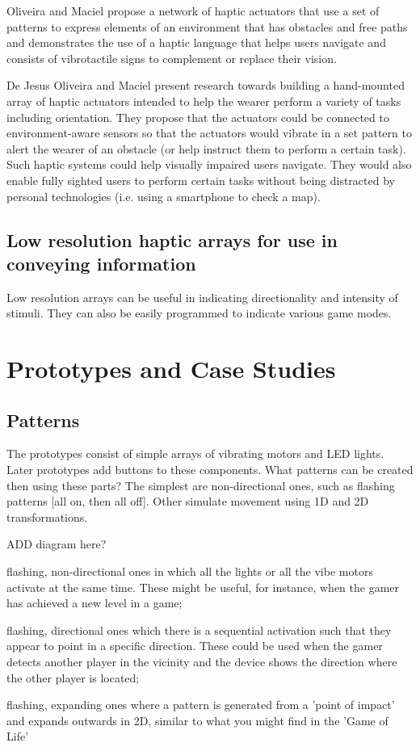 \documentclass{chi-ext}
\begin{document}
Oliveira and Maciel propose a network of haptic actuators that use a set of patterns to express elements of an environment that has obstacles and free paths and demonstrates the use of a haptic language that helps users navigate and consists of vibrotactile signs to complement or replace their vision. \cite{Jesus-Oliveira:2013aa}

De Jesus Oliveira and Maciel \cite{Jesus-Oliveira:2013aa} present research towards building a hand-mounted array of haptic actuators intended to help the wearer perform a variety of tasks including orientation. They propose that the actuators could be connected to environment-aware sensors so that the actuators would vibrate in a set pattern to alert the wearer of an obstacle (or help instruct them to perform a certain task). Such haptic systems could help visually impaired users navigate. They would also enable fully sighted users to perform certain tasks without being distracted by personal technologies (i.e. using a smartphone to check a map).

\subsection{Low resolution haptic arrays for use in conveying information}
Low resolution arrays can be useful in indicating directionality and intensity of stimuli. They can also be easily programmed to indicate various game modes. 

\section{Prototypes and Case Studies}
\subsection{Patterns}
The prototypes consist of simple arrays of vibrating motors and LED lights. Later prototypes add buttons to these components. What patterns can be created then using these parts? The simplest are non-directional ones, such as flashing patterns [all on, then all off]. Other simulate movement using 1D and 2D transformations.

ADD diagram here?

\begin{inparaenum}
\item flashing, non-directional ones in which all the lights or all the vibe motors activate at the same time. These might be useful, for instance, when the gamer has achieved a new level in a game;
\item flashing, directional ones which there is a sequential activation such that they appear to point in a specific direction. These could be used when the gamer detects another player in the vicinity and the device shows the direction where the other player is located;
\item flashing, expanding ones where a pattern is generated from a 'point of impact' and expands outwards in 2D, similar to what you might find in the 'Game of Life'
\end{inparaenum}
\end{document}
